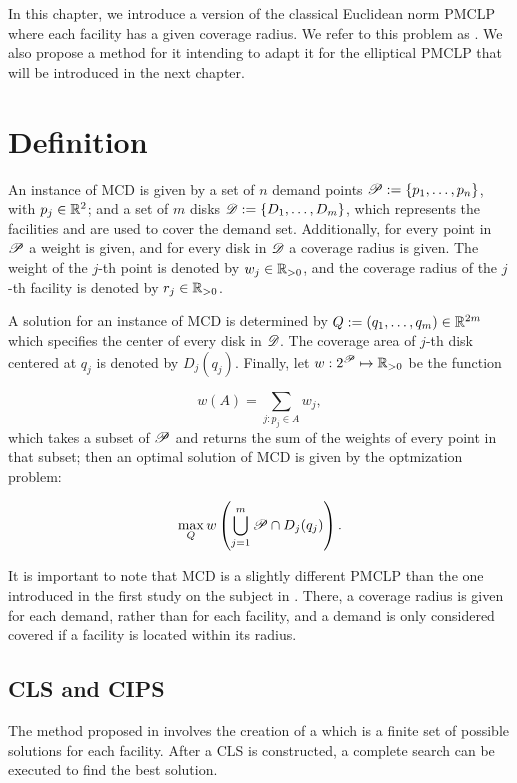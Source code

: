 In this chapter, we introduce a version of the classical Euclidean norm PMCLP where each facility has a given coverage radius. 
We refer to this problem as . We also propose a method for it intending to adapt it for the elliptical PMCLP that will be introduced in the next chapter. 

\section{Definition}

An instance of MCD is given by a set of $n$ demand points $\mathscr{P}:=\{p_1, \dots, p_n\}$, with $p_j\in\mathbb{R}^2$; and a set of $m$ disks $\mathscr{D}:=\{D_1, \dots, D_m\}$, which represents the facilities and are used to cover the demand set. Additionally, for every point in $\mathscr{P}$ a weight is given, and for every disk in $\mathscr{D}$ a coverage radius is given. The weight of the $j$-th point is denoted by $w_j\in\mathbb{R}_{>0}$, and the coverage radius of the $j$-th facility is denoted by $r_j \in \mathbb{R}_{>0}$.

A solution for an instance of MCD is determined by $Q:=(q_1, \dots, q_m) \in \mathbb{R}^{2m}$ which specifies the center of every disk in $\mathscr{D}$.
The coverage area of $j$-th disk centered at $q_j$ is denoted by $D_j(q_j)$. Finally, let $w : 2^{\mathscr{P}} \mapsto \mathbb{R}_{>0}$ be the function

\begin{equation}
w(A) = \sum_{j : p_j \in A} w_j,
\end{equation}
which takes a subset of $\mathscr{P}$ and returns the sum of the weights of every point in that subset; then an optimal solution of MCD is given by the optmization problem:

\begin{equation}
\max_{Q} w\left(\bigcup_{j=1}^m \mathscr{P} \cap D_j(q_j)\right).
\end{equation}

It is important to note that MCD is a slightly different PMCLP than the one introduced in the first study on the subject in . There, a coverage radius is given for each demand, rather than for each facility, and a demand is only considered covered if a facility is located within its radius. 

\subsection{CLS and CIPS}

The method proposed in  involves the creation of a  which is a finite set of possible solutions for each facility. After a CLS is constructed, a complete search can be executed to find the best solution.

